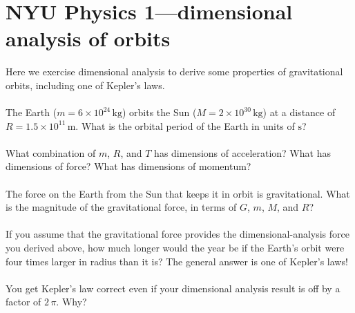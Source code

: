 \documentclass[12pt]{article}
\begin{document}
\newcommand{\kg}{\mathrm{kg}}
\newcommand{\m}{\mathrm{m}}
\newcommand{\s}{\mathrm{s}}
\newcommand{\mps}{\m\,\s^{-1}}
\thispagestyle{empty}

\section*{NYU Physics 1---dimensional analysis of orbits}

Here we exercise dimensional analysis to derive some properties of
gravitational orbits, including one of Kepler's laws.

\paragraph{\theproblem}%
The Earth ($m= 6\times 10^{24}\,\kg$) orbits the Sun ($M= 2\times
10^{30}\,\kg$) at a distance of $R= 1.5\times 10^{11}\,\m$.  What is
the orbital period of the Earth in units of $\s$?

\paragraph{\theproblem}%
What combination of $m$, $R$, and $T$ has dimensions of acceleration?
What has dimensions of force?  What has dimensions of momentum?

\paragraph{\theproblem}%
The force on the Earth from the Sun that keeps it in orbit is
gravitational.  What is the magnitude of the gravitational force, in
terms of $G$, $m$, $M$, and $R$?

\paragraph{\theproblem}%
If you assume that the gravitational force provides the
dimensional-analysis force you derived above, how much longer would
the year be if the Earth's orbit were four times larger in radius than
it is?  The general answer is one of Kepler's laws!

\paragraph{\theproblem}%
You get Kepler's law correct even if your dimensional analysis result
is off by a factor of $2\,\pi$.  Why?
\end{document}
